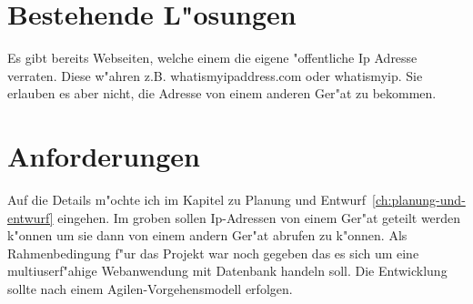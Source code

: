 \section{Bestehende L{"o}sungen}\label{sec:bestehende-losungen}
Es gibt bereits Webseiten, welche einem die eigene {"o}ffentliche Ip Adresse verraten.
Diese w{"a}hren z.B. whatismyipaddress.com\cite{whatismyipaddress} oder whatismyip\cite{whatismyip}.
Sie erlauben es aber nicht, die Adresse von einem anderen Ger{"a}t zu bekommen.

\section{Anforderungen}\label{sec:anforderungen}
Auf die Details m{"o}chte ich im Kapitel zu Planung und Entwurf~\ref{ch:planung-und-entwurf} eingehen.
Im groben sollen Ip-Adressen von einem Ger{"a}t geteilt werden k{"o}nnen um sie dann von einem andern Ger{"a}t abrufen zu k{"o}nnen.
Als Rahmenbedingung f{"u}r das Projekt war noch gegeben das es sich um eine multiuserf{"a}hige Webanwendung mit Datenbank handeln soll.
Die Entwicklung sollte nach einem Agilen-Vorgehensmodell erfolgen.


